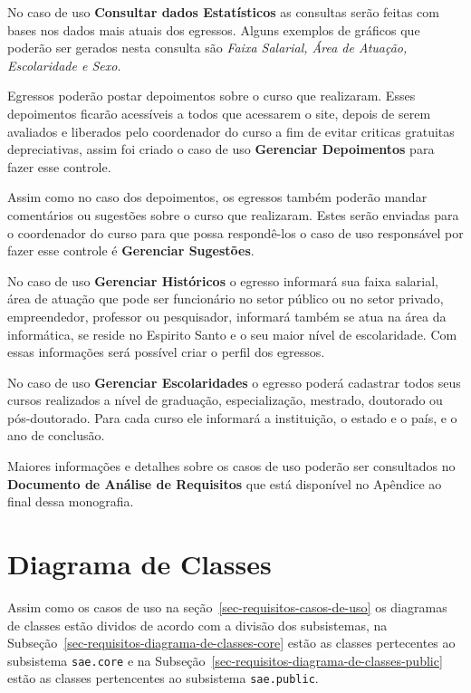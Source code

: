 No caso de uso \textbf{Consultar dados Estatísticos} as consultas serão feitas com bases nos dados mais atuais dos egressos. Alguns exemplos de gráficos que poderão ser gerados nesta consulta são \textit{Faixa Salarial, Área de Atuação, Escolaridade e Sexo}.
  	  
Egressos poderão postar depoimentos sobre o curso que realizaram. Esses depoimentos ficarão acessíveis a todos que acessarem o site, depois de serem avaliados e liberados pelo coordenador do curso a fim de evitar criticas gratuitas depreciativas, assim foi criado o caso de uso \textbf{Gerenciar Depoimentos} para fazer esse controle.  

Assim como no caso dos depoimentos, os egressos também poderão mandar comentários ou sugestões sobre o curso que realizaram. Estes serão enviadas para o coordenador do curso para que possa respondê-los o caso de uso responsável por fazer esse controle é \textbf{Gerenciar Sugestões}.


No caso de uso \textbf{Gerenciar Históricos} o egresso informará sua faixa salarial, área de atuação que pode ser funcionário no setor público ou no setor privado, empreendedor, professor ou pesquisador, informará também se atua na área da informática, se reside no Espirito Santo e o seu maior nível de escolaridade. Com essas informações será possível criar o perfil dos egressos.


No caso de uso \textbf{Gerenciar Escolaridades} o egresso poderá cadastrar todos seus cursos realizados a nível de graduação, especialização, mestrado, doutorado ou pós-doutorado. Para cada curso ele informará a instituição, o estado e o país, e o ano de conclusão.


Maiores informações e detalhes sobre os casos de uso poderão ser consultados no \textbf{Documento de Análise de Requisitos} que está disponível no Apêndice ao final dessa monografia.






\section{Diagrama de Classes}
\label{sec-requisitos-diagrama-de-classes}


Assim como os casos de uso na seção~\ref{sec-requisitos-casos-de-uso} os diagramas de classes estão dividos de acordo com a divisão dos subsistemas, na Subseção~\ref{sec-requisitos-diagrama-de-classes-core} estão as classes pertecentes ao subsistema \texttt{sae.core} e na Subseção~\ref{sec-requisitos-diagrama-de-classes-public} estão as classes pertencentes ao subsistema \texttt{sae.public}.




